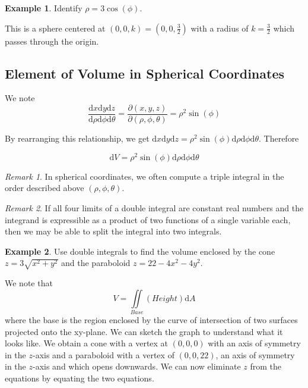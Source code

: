 \documentclass[11pt]{article}
\theoremstyle{plain} %
\theoremstyle{definition}
\theoremstyle{example}
\newtheorem*{example}{Example}
\theoremstyle{remark}
\newtheorem*{remark}{Remark}
\begin{document}
\begin{example}
Identify $\rho = 3 \cos(\phi)$.
\end{example}

This is a sphere centered at $(0,0,k) = \left(0,0,\frac{3}{2} \right)$ with a radius of $k=\frac{3}{2}$ which passes through the origin. 

\subsection{Element of Volume in Spherical Coordinates}

We note
$$\frac{\mathrm d x \mathrm d y \mathrm d z}{\mathrm d \rho \mathrm d \phi \mathrm d \theta } = \frac{\partial (x, y, z)}{\partial (\rho, \phi, \theta)} = \rho^2\sin(\phi)$$

By rearranging this relationship, we get $\mathrm d x \mathrm d y \mathrm d z = \rho^2\sin(\phi)\mathrm d \rho \mathrm d \phi \mathrm d \theta$. Therefore

$$\mathrm d V = \rho^2 \sin(\phi) \mathrm d \rho \mathrm d \phi \mathrm d \theta$$

\begin{remark}
In spherical coordinates, we often compute a triple integral in the order described above $(\rho, \phi, \theta)$. 
\end{remark}

\begin{remark}
If all four limits of a double integral are constant real numbers and the integrand is expressible as a product of two functions of a single variable each, then we may be able to split the integral into two integrals.
\end{remark}

\begin{example}
Use double integrals to find the volume enclosed by the cone $z = 3\sqrt{x^2 + y^2}$ and the paraboloid $z = 22-4x^2-4y^2$.
\end{example}

We note that $$V = \iint \limits_{Base} (Height)  \mathrm d A$$ where the base is the region enclosed by the curve of intersection of two surfaces projected onto the xy-plane. We can sketch the graph to understand what it looks like. We obtain a cone with a vertex at $(0,0,0)$ with an axis of symmetry in the $z$-axis and a paraboloid with a vertex of $(0,0,22)$, an axis of symmetry in the $z$-axis and which opens downwards. We can now eliminate $z$ from the equations by equating the two equations.  
\end{document}
